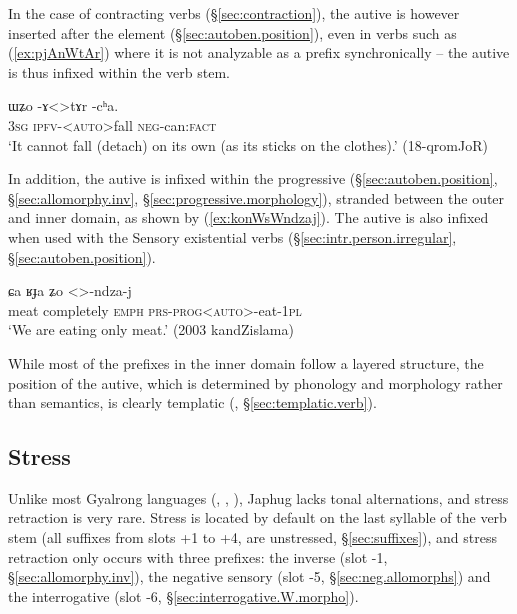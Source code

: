 In the case of contracting verbs (§\ref{sec:contraction}), the autive is however inserted after the  element (§\ref{sec:autoben.position}), even in verbs such as   (\ref{ex:pjAnWtAr}) where it is not analyzable as a prefix synchronically -- the autive is thus infixed within the verb stem.

\begin{exe}
\ex \label{ex:pjAnWtAr}
\gll ɯʑo -ɤ<>tɤr -cʰa. \\
\textsc{3sg} \textsc{ipfv}-<\textsc{auto}>fall \textsc{neg}-can:\textsc{fact} \\
\glt `It cannot fall (detach) on its own (as its sticks on the clothes).' (18-qromJoR) 
\end{exe}

In addition, the autive is infixed within the progressive  (§\ref{sec:autoben.position}, §\ref{sec:allomorphy.inv}, §\ref{sec:progressive.morphology}), stranded between the outer and inner domain, as shown by (\ref{ex:konWsWndzaj}). The autive is also infixed when used with the Sensory existential verbs (§\ref{sec:intr.person.irregular}, §\ref{sec:autoben.position}).

\begin{exe}
\ex \label{ex:konWsWndzaj}
\gll ɕa ʁɟa ʑo <>-ndza-j \\
meat completely \textsc{emph} \textsc{prs}-\textsc{prog}<\textsc{auto}>-eat-\textsc{1pl} \\
\glt `We are eating only meat.' (2003 kandZislama)
\end{exe}

While most of the prefixes in the inner domain follow a layered structure, the position of the autive, which is determined by phonology and morphology rather than semantics, is clearly templatic (\citealt[218]{bickel07inflectional}, §\ref{sec:templatic.verb}).

 

\subsection{Stress} \label{sec:stress.prefixal.chain}
 
Unlike most Gyalrong languages (\citealt{jackson05yingao}, \citealt{linyj12tone}, \citealt[69--81]{gong18these}), Japhug lacks tonal alternations, and stress retraction is very rare. Stress is located by default on the last syllable of the verb stem (all suffixes from slots +1 to +4, are unstressed, §\ref{sec:suffixes}), and stress retraction only occurs with three prefixes: the inverse   (slot -1, §\ref{sec:allomorphy.inv}), the  negative sensory  (slot -5, §\ref{sec:neg.allomorphs}) and the interrogative  (slot -6, §\ref{sec:interrogative.W.morpho}).

